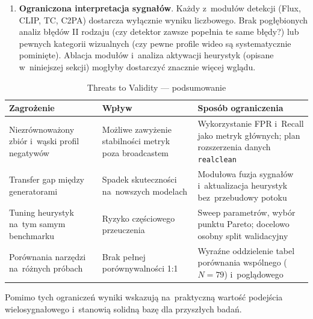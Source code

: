 \begin{enumerate}
  \item \textbf{Ograniczona interpretacja sygnałów}. 
    Każdy z~modułów detekcji (Flux, CLIP, TC, C2PA) dostarcza wyłącznie wyniku liczbowego.
    Brak pogłębionych analiz błędów II rodzaju (czy detektor zawsze popełnia te same błędy?)
    lub pewnych kategorii wizualnych (czy pewne profile wideo są systematycznie pominięte).
    Ablacja modułów i~analiza aktywacji heurystyk (opisane w~niniejszej sekcji)
    mogłyby dostarczyć znacznie więcej wglądu.

\end{enumerate}

\begin{table}[h]
\centering
\caption{Threats to Validity --- podsumowanie}
\label{tab:threats_summary}
\small
\begin{tabular}{L{4.6cm}L{4.5cm}L{5.8cm}}
\toprule
\textbf{Zagrożenie} & \textbf{Wpływ} & \textbf{Sposób ograniczenia} \\
\midrule
Niezrównoważony zbiór i~wąski profil negatywów &
Możliwe zawyżenie stabilności metryk poza broadcastem &
Wykorzystanie FPR i~Recall jako metryk głównych; plan rozszerzenia danych \texttt{realclean} \\
\addlinespace[2pt]
Transfer gap między generatorami &
Spadek skuteczności na~nowszych modelach &
Modułowa fuzja sygnałów i~aktualizacja heurystyk bez~przebudowy potoku \\
\addlinespace[2pt]
Tuning heurystyk na~tym samym benchmarku &
Ryzyko częściowego przeuczenia &
Sweep parametrów, wybór punktu Pareto; docelowo osobny split walidacyjny \\
\addlinespace[2pt]
Porównania narzędzi na~różnych próbach &
Brak pełnej porównywalności 1:1 &
Wyraźne oddzielenie tabel porównania wspólnego ($N=79$) i~poglądowego \\
\bottomrule
\end{tabular}
\end{table}

Pomimo tych ograniczeń wyniki wskazują na~praktyczną wartość podejścia wielosygnałowego
i~stanowią solidną bazę dla przyszłych badań.

